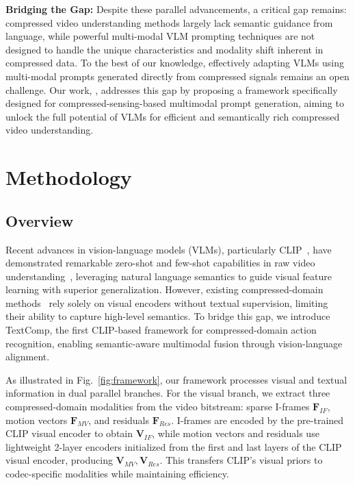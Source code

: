 \documentclass[runningheads]{llncs}
\begin{document}
\textbf{Bridging the Gap:} Despite these parallel advancements, a critical gap remains: compressed video understanding methods largely lack semantic guidance from language, while powerful multi-modal VLM prompting techniques are not designed to handle the unique characteristics and modality shift inherent in compressed data. To the best of our knowledge, effectively adapting VLMs using multi-modal prompts generated directly from compressed signals remains an open challenge. Our work, \methodname, addresses this gap by proposing a framework specifically designed for compressed-sensing-based multimodal prompt  generation, aiming to unlock the full potential of VLMs for efficient and semantically rich compressed video understanding.

\section{Methodology}
\label{sec:method}

\subsection{Overview}
\label{sec:baseline}

Recent advances in vision-language models (VLMs), particularly CLIP~\cite{radford2021learning}, have demonstrated remarkable zero-shot and few-shot capabilities in raw video understanding~\cite{wang2021actionclipnewparadigmvideo,ni2022expanding}, leveraging natural language semantics to guide visual feature learning with superior generalization. However, existing compressed-domain methods~\cite{li2023compressed,CFM-Net-li2025interactive} rely solely on visual encoders without textual supervision, limiting their ability to capture high-level semantics. To bridge this gap, we introduce TextComp, the first CLIP-based framework for compressed-domain action recognition, enabling semantic-aware multimodal fusion through vision-language alignment.

As illustrated in Fig.~\ref{fig:framework}, our framework processes visual and textual information in dual parallel branches. For the visual branch, we extract three compressed-domain modalities from the video bitstream: sparse I-frames $\mathbf{F}_{IF}$, motion vectors $\mathbf{F}_{MV}$, and residuals $\mathbf{F}_{Res}$. I-frames are encoded by the pre-trained CLIP visual encoder to obtain $\mathbf{V}_{IF}$, while motion vectors and residuals use lightweight 2-layer encoders initialized from the first and last layers of the CLIP visual encoder, producing $\mathbf{V}_{MV}, \mathbf{V}_{Res}$. This transfers CLIP's visual priors to codec-specific modalities while maintaining efficiency.
\end{document}
